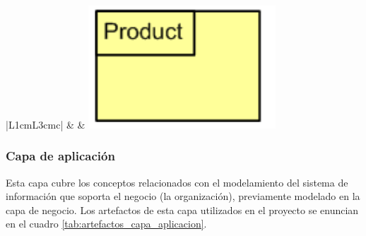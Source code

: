 \begin{table}
\begin{center}
{\begin{tabular}{|L{1cm}L{3cm}c|}
	\hline
	 & 
     &  
    \includegraphics[width=7cm]{./imagenes/Archimate/businessproduct.png}\\
	\hline
  \end{tabular}
  }
    \end{center}
\end{table}

\subsubsection{Capa de aplicación} 

Esta capa cubre los conceptos relacionados con el modelamiento del sistema de información que soporta el negocio (la organización), previamente modelado en la capa de negocio. Los artefactos de esta capa utilizados en el proyecto se enuncian en el cuadro \ref{tab:artefactos_capa_aplicacion}.

